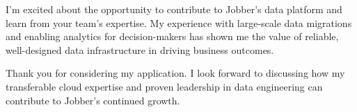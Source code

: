 \documentclass[11pt, letterpaper]{awesome-cv}
\begin{document}
\begin{cvletter}
I'm excited about the opportunity to contribute to Jobber's data platform and learn from your team's expertise. My experience with large-scale data migrations and enabling analytics for decision-makers has shown me the value of reliable, well-designed data infrastructure in driving business outcomes.

Thank you for considering my application. I look forward to discussing how my transferable cloud expertise and proven leadership in data engineering can contribute to Jobber's continued growth.
\end{cvletter}


\makeletterclosing%
\end{document}
